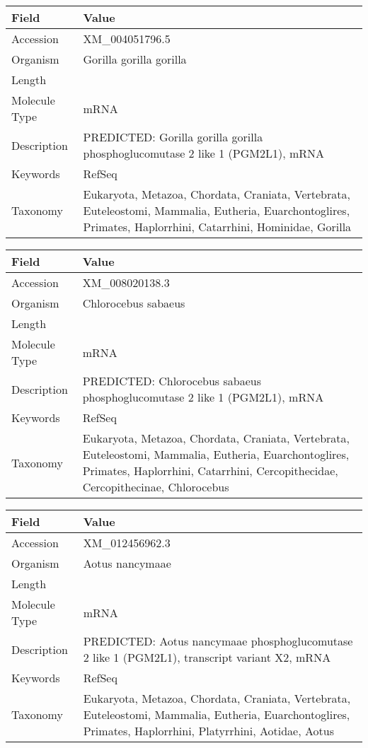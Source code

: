 \documentclass[10pt]{article}
\begin{document}
\vspace{1em}
{\footnotesize
\begin{longtable}{>{\raggedright\arraybackslash}p{4.5cm} >{\raggedright\arraybackslash}p{11.5cm}}
\textbf{Field} & \textbf{Value} \\
\hline
Accession & XM\_004051796.5 \\
Organism & Gorilla gorilla gorilla \\
Length & 3083 \\
Molecule Type & mRNA \\
Description & PREDICTED: Gorilla gorilla gorilla phosphoglucomutase 2 like 1 (PGM2L1), mRNA \\
Keywords & RefSeq \\
Taxonomy & Eukaryota, Metazoa, Chordata, Craniata, Vertebrata, Euteleostomi, Mammalia, Eutheria, Euarchontoglires, Primates, Haplorrhini, Catarrhini, Hominidae, Gorilla \\
\end{longtable}
}

\vspace{1em}
{\footnotesize
\begin{longtable}{>{\raggedright\arraybackslash}p{4.5cm} >{\raggedright\arraybackslash}p{11.5cm}}
\textbf{Field} & \textbf{Value} \\
\hline
Accession & XM\_008020138.3 \\
Organism & Chlorocebus sabaeus \\
Length & 6703 \\
Molecule Type & mRNA \\
Description & PREDICTED: Chlorocebus sabaeus phosphoglucomutase 2 like 1 (PGM2L1), mRNA \\
Keywords & RefSeq \\
Taxonomy & Eukaryota, Metazoa, Chordata, Craniata, Vertebrata, Euteleostomi, Mammalia, Eutheria, Euarchontoglires, Primates, Haplorrhini, Catarrhini, Cercopithecidae, Cercopithecinae, Chlorocebus \\
\end{longtable}
}

\vspace{1em}
{\footnotesize
\begin{longtable}{>{\raggedright\arraybackslash}p{4.5cm} >{\raggedright\arraybackslash}p{11.5cm}}
\textbf{Field} & \textbf{Value} \\
\hline
Accession & XM\_012456962.3 \\
Organism & Aotus nancymaae \\
Length & 4402 \\
Molecule Type & mRNA \\
Description & PREDICTED: Aotus nancymaae phosphoglucomutase 2 like 1 (PGM2L1), transcript variant X2, mRNA \\
Keywords & RefSeq \\
Taxonomy & Eukaryota, Metazoa, Chordata, Craniata, Vertebrata, Euteleostomi, Mammalia, Eutheria, Euarchontoglires, Primates, Haplorrhini, Platyrrhini, Aotidae, Aotus \\
\end{longtable}
}
\end{document}
